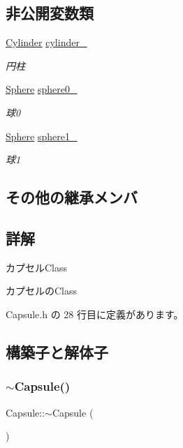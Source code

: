 \subsection*{非公開変数類}
\begin{DoxyCompactItemize}
\item 
\mbox{\hyperlink{class_cylinder}{Cylinder}} \mbox{\hyperlink{class_capsule_a7b7f46d36a0d810555aa5eb62da6a8ed}{cylinder\+\_\+}}
\begin{DoxyCompactList}\small\item\em 円柱 \end{DoxyCompactList}\item 
\mbox{\hyperlink{class_sphere}{Sphere}} \mbox{\hyperlink{class_capsule_a37c7db7fe8cb06be2f374d7aba24267e}{sphere0\+\_\+}}
\begin{DoxyCompactList}\small\item\em 球0 \end{DoxyCompactList}\item 
\mbox{\hyperlink{class_sphere}{Sphere}} \mbox{\hyperlink{class_capsule_ac478efc95993a85908a7cd2759133ab2}{sphere1\+\_\+}}
\begin{DoxyCompactList}\small\item\em 球1 \end{DoxyCompactList}\end{DoxyCompactItemize}
\subsection*{その他の継承メンバ}


\subsection{詳解}
カプセル\+Class 

カプセルの\+Class 

 Capsule.\+h の 28 行目に定義があります。



\subsection{構築子と解体子}
\mbox{\label{class_capsule_abfd7f0348ce8e7f8ee4e70374ae27533}} 
\subsubsection{\texorpdfstring{$\sim$\+Capsule()}{~Capsule()}}
{\footnotesize\ttfamily Capsule\+::$\sim$\+Capsule (\begin{DoxyParamCaption}{ }\end{DoxyParamCaption})}



